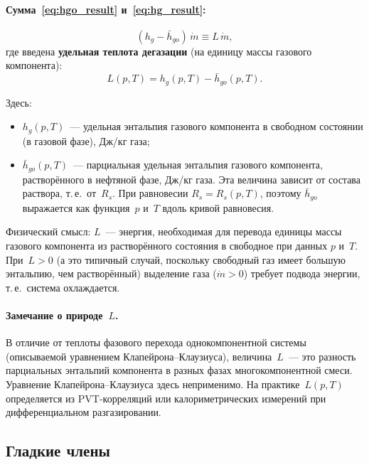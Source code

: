\documentclass[12pt,a4paper]{article}
\begin{document}
\paragraph{Сумма~\eqref{eq:hgo_result} и~\eqref{eq:hg_result}:}
\begin{equation}\label{eq:phase_change_heat}
  \boxed{
    (h_g - \bar{h}_{go})\,\dot{m} \equiv L\,\dot{m},
  }
\end{equation}
где введена \textbf{удельная теплота дегазации} (на единицу массы
газового компонента):
\begin{equation}\label{eq:L_def}
  \boxed{
    L(p,T) = h_g(p,T) - \bar{h}_{go}(p,T).
  }
\end{equation}

Здесь:
\begin{itemize}[nosep]
  \item $h_g(p,T)$~--- удельная энтальпия газового компонента в
        свободном состоянии (в газовой фазе), Дж/кг газа;
  \item $\bar{h}_{go}(p,T)$~--- парциальная удельная энтальпия газового
        компонента, растворённого в нефтяной фазе, Дж/кг газа.
        Эта величина зависит от состава раствора, т.\,е.\ от~$R_s$.
        При равновесии $R_s = R_s(p,T)$, поэтому $\bar{h}_{go}$
        выражается как функция~$p$ и~$T$ вдоль кривой равновесия.
\end{itemize}

Физический смысл: $L$~--- энергия, необходимая для перевода единицы
массы газового компонента из растворённого состояния в свободное при
данных $p$ и~$T$. При~$L > 0$ (а это типичный случай, поскольку
свободный газ имеет большую энтальпию, чем растворённый) выделение
газа ($\dot{m} > 0$) требует подвода энергии, т.\,е.\ система
охлаждается.

\paragraph{Замечание о природе~$L$.}
В отличие от теплоты фазового перехода однокомпонентной системы (описываемой
уравнением Клапейрона--Клаузиуса), величина~$L$~--- это разность парциальных
энтальпий компонента в разных фазах многокомпонентной смеси. Уравнение
Клапейрона--Клаузиуса здесь неприменимо. На практике~$L(p,T)$ определяется
из PVT-корреляций или калориметрических измерений при дифференциальном
разгазировании.

\subsection{Гладкие члены}\label{ssec:smooth_terms}
\end{document}
